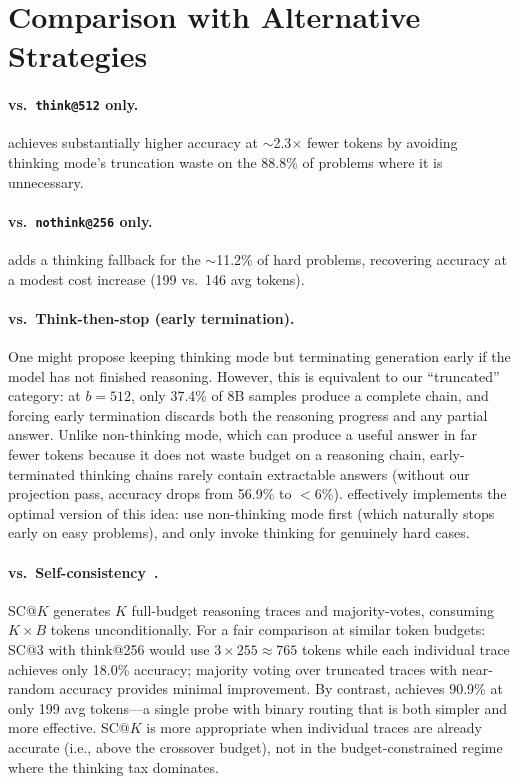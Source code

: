\section{Comparison with Alternative Strategies}
\label{app:comparison}

\paragraph{vs.\ \texttt{think@512} only.}
\method{} achieves substantially higher accuracy at
${\sim}$2.3$\times$ fewer tokens by avoiding thinking mode's truncation waste on the
88.8\% of problems where it is unnecessary.

\paragraph{vs.\ \texttt{nothink@256} only.}
\method{} adds a thinking fallback for the $\sim$11.2\% of hard
problems, recovering accuracy at a modest cost increase
(199 vs.\ 146 avg tokens).

\paragraph{vs.\ Think-then-stop (early termination).}
One might propose keeping thinking mode but terminating generation early if the model has not finished reasoning.
However, this is equivalent to our ``truncated'' category: at $b{=}512$, only 37.4\% of 8B samples produce a complete chain, and forcing early termination discards both the reasoning progress and any partial answer.
Unlike non-thinking mode, which can produce a useful answer in far fewer tokens because it does not waste budget on a reasoning chain, early-terminated thinking chains rarely contain extractable answers (without our projection pass, accuracy drops from 56.9\% to ${<}$6\%).
\method{} effectively implements the optimal version of this idea: use non-thinking mode first (which naturally stops early on easy problems), and only invoke thinking for genuinely hard cases.

\paragraph{vs.\ Self-consistency~\cite{wang2023selfconsistency}.}
SC@$K$ generates $K$ full-budget reasoning traces and majority-votes,
consuming $K \times B$ tokens unconditionally.
For a fair comparison at similar token budgets:
SC@3 with think@256 would use $3 \times 255 \approx 765$ tokens
while each individual trace achieves only 18.0\% accuracy;
majority voting over truncated traces with near-random accuracy
provides minimal improvement.
By contrast, \method{} achieves 90.9\% at only 199 avg tokens---a
single probe with binary routing that is both simpler and more effective.
SC@$K$ is more appropriate when individual traces are already accurate
(i.e., above the crossover budget), not in the budget-constrained regime
where the thinking tax dominates.

